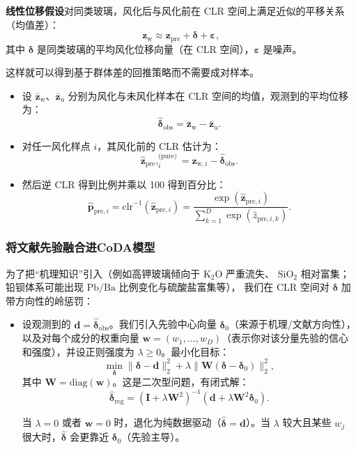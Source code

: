 \documentclass[withoutpreface,bwprint]{cumcmthesis}
\begin{document}
\textbf{线性位移假设}\quad 对同类玻璃，风化后与风化前在 CLR 空间上满足近似的平移关系（均值差）：  
\[
\mathbf{z}_\text{w} \approx \mathbf{z}_\text{pre} + \boldsymbol{\delta} + \boldsymbol{\varepsilon},
\]  
其中 $\boldsymbol{\delta}$ 是同类玻璃的平均风化位移向量（在 CLR 空间），$\boldsymbol{\varepsilon}$ 是噪声。  

这样就可以得到基于群体差的回推策略而不需要成对样本。  

\begin{itemize}
\item 设 $\bar{\mathbf{z}}_\text{w}$、$\bar{\mathbf{z}}_\text{u}$ 分别为风化与未风化样本在 CLR 空间的均值，观测到的平均位移为：  
\[
\hat{\boldsymbol{\delta}}_\text{obs} = \bar{\mathbf{z}}_\text{w} - \bar{\mathbf{z}}_\text{u}.
\]  

\item 对任一风化样点 $i$，其风化前的 CLR 估计为：  
\[
\hat{\mathbf{z}}_\text{pre},_i^\text{(pure)} = \mathbf{z}_{\text{w},i} - \hat{\boldsymbol{\delta}}_\text{obs}.
\]  

\item 然后逆 CLR 得到比例并乘以 100 得到百分比：  
\[
\hat{\mathbf{p}}_{\text{pre},i} = \text{clr}^{-1}\!\left( \hat{\mathbf{z}}_{\text{pre},i} \right) 
= \frac{\exp\!\left( \hat{\mathbf{z}}_{\text{pre},i} \right)}{\sum_{k=1}^D \exp\!\left( \hat{z}_{\text{pre},i,k} \right)}.
\]  
\end{itemize}

\subsubsection{将文献先验融合进CoDA模型}

为了把“机理知识”引入（例如高钾玻璃倾向于 $\mathrm{K}_2\mathrm{O}$ 严重流失、
$\mathrm{SiO}_2$ 相对富集；铅钡体系可能出现 $\mathrm{Pb}/\mathrm{Ba}$ 比例变化与硫酸盐富集等），
我们在 CLR 空间对 $\boldsymbol{\delta}$ 加带方向性的岭惩罚：

\begin{itemize}

\item 设观测到的 $\boldsymbol{d} = \hat{\boldsymbol{\delta}}_{\text{obs}}$。我们引入先验中心向量 $\boldsymbol{\delta}_0$（来源于机理/文献方向性），以及对每个成分的权重向量 $\mathbf{w} = (w_1, \ldots, w_D)$（表示你对该分量先验的信心和强度），并设正则强度为 $\lambda \geq 0$。最小化目标：
\[
\min_{\boldsymbol{\delta}} \|\boldsymbol{\delta} - \boldsymbol{d}\|_2^2 + \lambda \|\mathbf{W}(\boldsymbol{\delta} - \boldsymbol{\delta}_0)\|_2^2,
\]
其中 $\mathbf{W} = \text{diag}(\mathbf{w})$。这是二次型问题，有闭式解：
\[
\hat{\boldsymbol{\delta}}_{\text{reg}} = (\mathbf{I} + \lambda \mathbf{W}^2)^{-1} (\boldsymbol{d} + \lambda \mathbf{W}^2 \boldsymbol{\delta}_0).
\]

当 $\lambda = 0$ 或者 $\mathbf{w} = 0$ 时，退化为纯数据驱动（$\hat{\boldsymbol{\delta}} = \boldsymbol{d}$）。当 $\lambda$ 较大且某些 $w_j$ 很大时，$\hat{\boldsymbol{\delta}}$ 会更靠近 $\boldsymbol{\delta}_0$（先验主导）。

\end{itemize}
\end{document}
